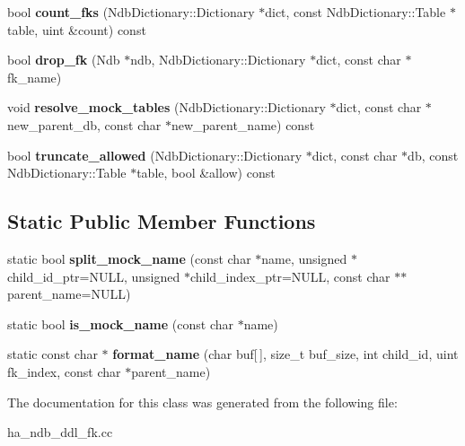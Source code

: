 \begin{DoxyCompactItemize}
\item 
\mbox{\label{classFk__util_a6a661b626763285b4023a90783cfa3bc}} 
bool {\bfseries count\+\_\+fks} (Ndb\+Dictionary\+::\+Dictionary $\ast$dict, const Ndb\+Dictionary\+::\+Table $\ast$table, uint \&count) const
\item 
\mbox{\label{classFk__util_a4c3cd31383ace95100c500e5a69bd607}} 
bool {\bfseries drop\+\_\+fk} (Ndb $\ast$ndb, Ndb\+Dictionary\+::\+Dictionary $\ast$dict, const char $\ast$fk\+\_\+name)
\item 
\mbox{\label{classFk__util_a5766d465414412c8cfbcff66a299eea7}} 
void {\bfseries resolve\+\_\+mock\+\_\+tables} (Ndb\+Dictionary\+::\+Dictionary $\ast$dict, const char $\ast$new\+\_\+parent\+\_\+db, const char $\ast$new\+\_\+parent\+\_\+name) const
\item 
\mbox{\label{classFk__util_a3b8bd0f5db19c739f1a8a216c6c062d9}} 
bool {\bfseries truncate\+\_\+allowed} (Ndb\+Dictionary\+::\+Dictionary $\ast$dict, const char $\ast$db, const Ndb\+Dictionary\+::\+Table $\ast$table, bool \&allow) const
\end{DoxyCompactItemize}
\subsection*{Static Public Member Functions}
\begin{DoxyCompactItemize}
\item 
\mbox{\label{classFk__util_a1135c1e23c1cd176fc54af87079d641d}} 
static bool {\bfseries split\+\_\+mock\+\_\+name} (const char $\ast$name, unsigned $\ast$child\+\_\+id\+\_\+ptr=N\+U\+LL, unsigned $\ast$child\+\_\+index\+\_\+ptr=N\+U\+LL, const char $\ast$$\ast$parent\+\_\+name=N\+U\+LL)
\item 
\mbox{\label{classFk__util_a1a59b0d4c17161e4809d657543254d23}} 
static bool {\bfseries is\+\_\+mock\+\_\+name} (const char $\ast$name)
\item 
\mbox{\label{classFk__util_aa0a459a2bb944eb1260acc88bd795ad1}} 
static const char $\ast$ {\bfseries format\+\_\+name} (char buf\mbox{[}$\,$\mbox{]}, size\+\_\+t buf\+\_\+size, int child\+\_\+id, uint fk\+\_\+index, const char $\ast$parent\+\_\+name)
\end{DoxyCompactItemize}


The documentation for this class was generated from the following file\+:\begin{DoxyCompactItemize}
\item 
ha\+\_\+ndb\+\_\+ddl\+\_\+fk.\+cc\end{DoxyCompactItemize}
